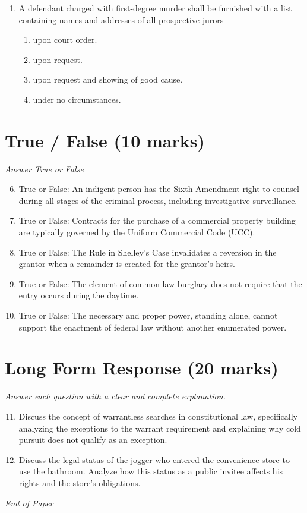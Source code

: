 \documentclass[12pt]{article}
\begin{document}
\begin{enumerate}[label=\arabic*.]
\begin{enumerate}[label=(\alph*)]
    \item Gender
    \item Interstate travel
    \item Privacy
    \item Alienage
\end{enumerate}
\item A defendant charged with first-degree murder shall be furnished with a list containing names and addresses of all prospective jurors
\begin{enumerate}[label=(\alph*)]
    \item upon court order.
    \item upon request.
    \item upon request and showing of good cause.
    \item under no circumstances.
\end{enumerate}
\end{enumerate}

\section*{True / False (10 marks)}
\textit{Answer True or False}
\begin{enumerate}[label=\arabic*.]
\setcounter{enumi}{5}
\item True or False: An indigent person has the Sixth Amendment right to counsel during all stages of the criminal process, including investigative surveillance.
\item True or False: Contracts for the purchase of a commercial property building are typically governed by the Uniform Commercial Code (UCC).
\item True or False: The Rule in Shelley's Case invalidates a reversion in the grantor when a remainder is created for the grantor's heirs.
\item True or False: The element of common law burglary does not require that the entry occurs during the daytime.
\item True or False: The necessary and proper power, standing alone, cannot support the enactment of federal law without another enumerated power.
\end{enumerate}

\section*{Long Form Response (20 marks)}
\textit{Answer each question with a clear and complete explanation.}
\begin{enumerate}[label=\arabic*.]
\setcounter{enumi}{10}
\item Discuss the concept of warrantless searches in constitutional law, specifically analyzing the exceptions to the warrant requirement and explaining why cold pursuit does not qualify as an exception.
\item Discuss the legal status of the jogger who entered the convenience store to use the bathroom. Analyze how this status as a public invitee affects his rights and the store's obligations.
\end{enumerate}

\vfill
\noindent\textit{End of Paper}
\end{document}
